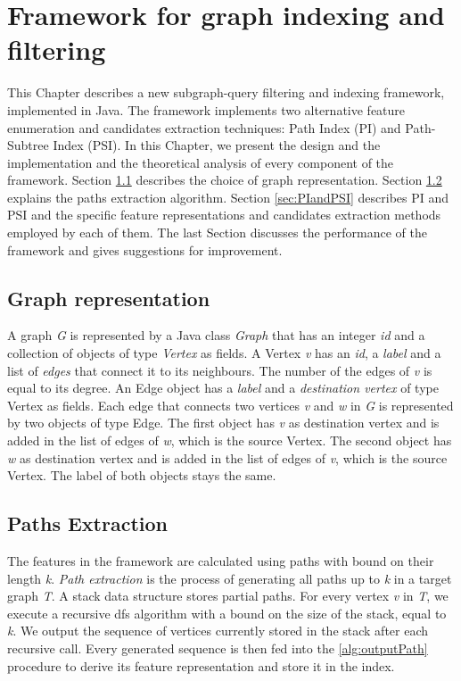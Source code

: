 \documentclass{l4proj}
\begin{document}
\chapter{Framework for graph indexing and filtering}
This Chapter describes a new subgraph-query filtering and indexing framework, implemented in Java. The framework implements two alternative feature enumeration and candidates extraction techniques: Path Index (PI) and Path-Subtree Index (PSI). In this Chapter, we present the design and the implementation and the theoretical analysis of every component of the framework. Section \ref{sec:graph-representation} describes the choice of graph representation. Section \ref{sec:pathsExtraction} explains the paths extraction algorithm. Section \ref{sec:PIandPSI} describes PI and PSI and the specific feature representations and candidates extraction methods employed by each of them. The last Section discusses the performance of the framework and gives suggestions for improvement.

\section{Graph representation}
\label{sec:graph-representation}
A graph \emph{G} is represented by a Java class \emph{Graph} that has an integer \emph{id} and a collection of objects of type \emph{Vertex} as fields. A Vertex \emph{v} has an \emph{id}, a \emph{label} and a list of \emph{edges} that connect it to its neighbours. The number of the edges of \emph{v} is equal to its degree. An Edge object has a \emph{label} and a \emph{destination vertex} of type Vertex as fields. Each edge that connects two vertices \emph{v} and \emph{w} in \emph{G} is represented by two objects of type Edge. The first object has \emph{v} as destination vertex and is added in the list of edges of \emph{w}, which is the source Vertex. The second object has \emph{w} as destination vertex and is added in the list of edges of \emph{v}, which is the source Vertex. The label of both objects stays the same.

\section{Paths Extraction}
\label{sec:pathsExtraction}
The features in the framework are calculated using paths with bound on their length \emph{k}. \emph{Path extraction} is the process of generating all paths up to \emph{k} in a target graph \emph{T}. A stack data structure stores partial paths. For every vertex \emph{v} in \emph{T}, we execute a recursive \gls{dfs} algorithm with a bound on the size of the stack, equal to \emph{k}. We output the sequence of vertices currently stored in the stack after each recursive call. Every generated sequence is then fed into the \ref{alg:outputPath} procedure to derive its feature representation and store it in the index.
\end{document}
